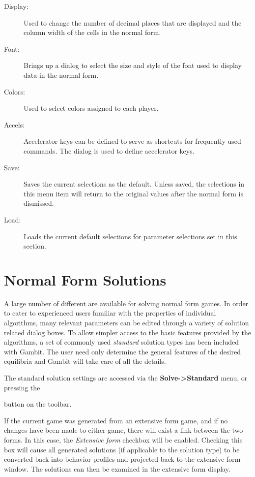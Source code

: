 \begin{description}
\item[Display:] Used to change the number of decimal places that are displayed and the column width of the cells in the normal form.  
\item[Font:] Brings up a dialog to select the size and style of the font used to display data in the normal form.  
\item[Colors:] Used to select colors assigned to each player.
\item[Accels:] Accelerator keys can be defined to serve as
shortcuts for frequently used commands.  The   dialog is used to define accelerator keys. 
\item[Save:] Saves the current selections as the default.  Unless
saved, the selections in this menu item will return to the original
values after the normal form is dismissed.
\item[Load:] Loads the current default selections for parameter
selections set in this section.
\end{description}

\section{Normal Form Solutions}\label{NormalFormSolutions}
A large number of different  
are available for solving normal form games.  In order to cater to
experienced users familiar with the properties of individual
algorithms, many relevant parameters can be edited through a variety
of solution related dialog boxes.  To allow simpler access to the
basic features provided by the algorithms, a set of commonly used {\em
standard} solution types has been included with Gambit.  The user need
only determine the general features of the desired equilibria and
Gambit will take care of all the details.

The standard solution settings are accessed via the {\bf 
Solve->Standard} menu, or pressing the
\begin{figure}
\end{figure}
 button on the toolbar.

If the current game was generated from an extensive form game, and if no
changes have been made to either game, there will exist a link between the
two forms.  In this case, the {\em Extensive form} checkbox will be
enabled.  Checking this box will cause all generated solutions (if
applicable to the solution type) to be converted back into behavior
profiles and projected back to the extensive form window.  The solutions
can then be examined in the extensive form display.

